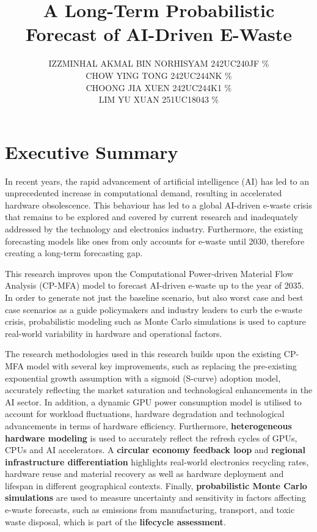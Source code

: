\documentclass[a4paper, 12pt]{article}
\author{
IZZMINHAL AKMAL BIN NORHISYAM \quad 242UC240JF \quad 25\% \\
CHOW YING TONG \quad 242UC244NK \quad 25\% \\
CHOONG JIA XUEN \quad 242UC244K1 \quad 25\% \\
LIM YU XUAN \quad 251UC18043 \quad 25\% \\
}
\title{ A Long-Term Probabilistic Forecast of AI-Driven E-Waste }
\begin{document}
\maketitle

\section*{Executive Summary}
In recent years, the rapid advancement of artificial intelligence (AI) has led to an unprecedented increase in computational demand, resulting in accelerated hardware obsolescence. This behaviour has led to a global AI-driven e-waste crisis that remains to be explored and covered by current research and inadequately addressed by the technology and electronics industry. Furthermore, the existing forecasting models like ones from \citet{wang_2024_ewaste} only accounts for e-waste until 2030, therefore creating a long-term forecasting gap. 
\par This research improves upon the Computational Power-driven Material Flow Analysis (CP-MFA) model to forecast AI-driven e-waste up to the year of 2035. In order to generate not just the baseline scenario, but also worst case and best case scenarios as a guide policymakers and industry leaders to curb the e-waste crisis, probabilistic modeling such as Monte Carlo simulations is used to capture real-world variability in hardware and operational factors.
\par The research methodologies used in this research builds upon the existing CP-MFA model with several key improvements, such as replacing the pre-existing exponential growth assumption with a sigmoid (S-curve) adoption model, accurately reflecting the market saturation and technological enhancements in the AI sector. In addition, a dynamic GPU power consumption model is utilised to account for workload fluctuations, hardware degradation and technological advancements in terms of hardware efficiency. Furthermore, \textbf{heterogeneous hardware modeling} is used to accurately reflect the refresh cycles of GPUs, CPUs and AI accelerators. A \textbf{circular economy feedback loop} and \textbf{regional infrastructure differentiation} highlights real-world electronics recycling rates, hardware reuse and material recovery as well as hardware deployment and lifespan in different geographical contexts. Finally, \textbf{probabilistic Monte Carlo simulations} are used to measure uncertainty and sensitivity in factors affecting e-waste forecasts, such as emissions from manufacturing, transport, and toxic waste disposal, which is part of the \textbf{lifecycle assessment}.
\end{document}

